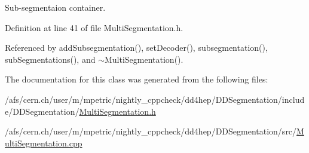 Sub-\/segmentaion container. 



Definition at line 41 of file Multi\+Segmentation.\+h.



Referenced by add\+Subsegmentation(), set\+Decoder(), subsegmentation(), sub\+Segmentations(), and $\sim$\+Multi\+Segmentation().



The documentation for this class was generated from the following files\+:\begin{DoxyCompactItemize}
\item 
/afs/cern.\+ch/user/m/mpetric/nightly\+\_\+cppcheck/dd4hep/\+D\+D\+Segmentation/include/\+D\+D\+Segmentation/\hyperlink{_d_d_segmentation_2include_2_d_d_segmentation_2_multi_segmentation_8h}{Multi\+Segmentation.\+h}\item 
/afs/cern.\+ch/user/m/mpetric/nightly\+\_\+cppcheck/dd4hep/\+D\+D\+Segmentation/src/\hyperlink{_d_d_segmentation_2src_2_multi_segmentation_8cpp}{Multi\+Segmentation.\+cpp}\end{DoxyCompactItemize}
